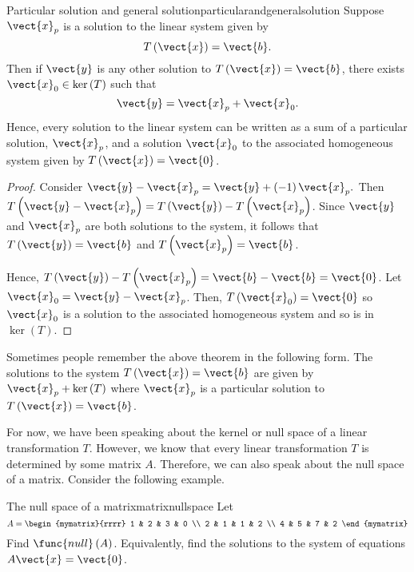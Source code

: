 \begin{theorem}{Particular solution and general solution}{particularandgeneralsolution}
Suppose $\vect{x}_{p}$ is a solution to the linear system given by
\begin{equation*}
T\left( \vect{x} \right) = \vect{b}.
\end{equation*}
Then if $\vect{y}$ is any other solution to $T\left(\vect{x}\right)=\vect{b}$, 
 there exists $\vect{x}_0 \in \ker
\left( T\right) $ such that
\begin{equation*}
\vect{y} = \vect{x}_{p}+ \vect{x}_0.
\end{equation*}
Hence, every solution to the linear system can be written as a sum of a particular solution, $\vect{x}_p$,
 and a solution $\vect{x}_0$ to the associated 
homogeneous system given by $T\left(\vect{x}\right)=\vect{0}$.
\end{theorem}

\begin{proof}
Consider $\vect{y} - \vect{x}_{p}= \vect{y} + \left(
-1\right) \vect{x}_{p}.$ Then $T\left( \vect{y} - \vect{x}_{p}\right) =T\left(\vect{y}\right)
-T\left( \vect{x}_{p} \right)$. Since $\vect{y}$ and $\vect{x}_{p}$ are both solutions to the system, it follows that $T\left(\vect{y}\right)= \vect{b} $
and $T\left(\vect{x}_p\right) = \vect{b}$. 

Hence, $T\left(\vect{y}\right)-T\left( \vect{x}_{p} \right)
=\vect{b} - \vect{b} = \vect{0}$.  Let $\vect{x}_0 = \vect{y} - \vect{x}_{p}$.
Then, $T\left(\vect{x}_0\right)= \vect{0} $ so $\vect{x}_0$ is a solution to the associated homogeneous system and so is in $\ker \left(T\right)$.
\end{proof}

Sometimes people remember the above theorem in the following form. The
solutions to the system $T\left(\vect{x}\right)=\vect{b}$ are given by 
$\vect{x}_{p}+\ker \left( T\right) $ where $\vect{x}_{p}$ is a particular
solution to $T\left(\vect{x}\right)=\vect{b}$.

For now, we have been speaking about the kernel or null space of a linear transformation $T$. However, 
we know that every linear transformation $T$ is determined by some matrix $A$. Therefore,
we can also speak about the null space of a matrix. Consider the following example.  

\begin{example}{The null space of a matrix}{matrixnullspace}
Let
\begin{equation*}
A=\begin{mymatrix}{rrrr}
1 & 2 & 3 & 0 \\
2 & 1 & 1 & 2 \\
4 & 5 & 7 & 2
\end{mymatrix}
\end{equation*}
Find $\func{null} \left( A\right) $. Equivalently, find the solutions to the
system of equations $A\vect{x}=\vect{0}$.
\end{example}

